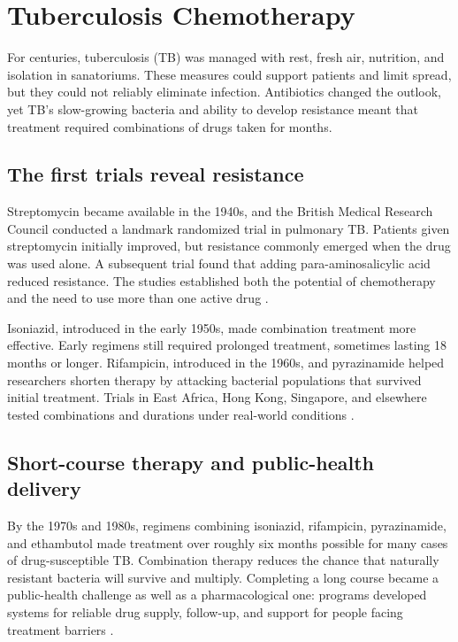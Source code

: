 \documentclass[12pt,oneside]{book}
\begin{document}
\chapter[Tuberculosis Chemotherapy]{Tuberculosis Chemotherapy}

For centuries, tuberculosis (TB) was managed with rest, fresh air, nutrition,
and isolation in sanatoriums. These measures could support patients and limit
spread, but they could not reliably eliminate infection. Antibiotics changed
the outlook, yet TB's slow-growing bacteria and ability to develop resistance
meant that treatment required combinations of drugs taken for months.

\section{The first trials reveal resistance}
Streptomycin became available in the 1940s, and the British Medical Research Council conducted a landmark randomized trial in pulmonary TB. Patients given streptomycin initially improved, but resistance commonly emerged when the drug was used alone. A subsequent trial found that adding para-aminosalicylic acid reduced resistance. The studies established both the potential of chemotherapy and the need to use more than one active drug \cite{tbChemotherapyReview}.

Isoniazid, introduced in the early 1950s, made combination treatment more
effective. Early regimens still required prolonged treatment, sometimes
lasting 18 months or longer. Rifampicin, introduced in the 1960s, and
pyrazinamide helped researchers shorten therapy by attacking bacterial
populations that survived initial treatment. Trials in East Africa, Hong Kong,
Singapore, and elsewhere tested combinations and durations under real-world
conditions \cite{tbChemotherapyReview,tbTreatmentHistory}.

\section{Short-course therapy and public-health delivery}
By the 1970s and 1980s, regimens combining isoniazid, rifampicin, pyrazinamide, and ethambutol made treatment over roughly six months possible for many cases of drug-susceptible TB. Combination therapy reduces the chance that naturally resistant bacteria will survive and multiply. Completing a long course became a public-health challenge as well as a pharmacological one: programs developed systems for reliable drug supply, follow-up, and support for people facing treatment barriers \cite{tbTreatmentHistory}.
\end{document}
